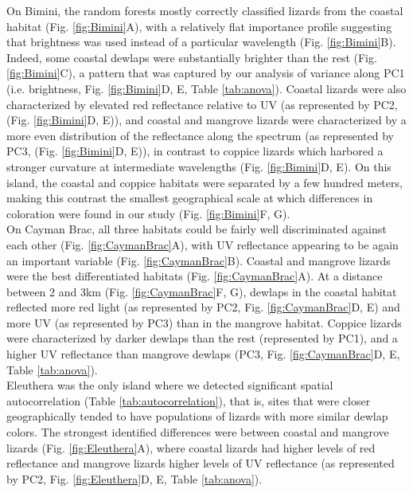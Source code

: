 On Bimini, the random forests mostly correctly classified lizards from the coastal habitat (Fig. \ref{fig:Bimini}A), with a relatively flat importance profile suggesting that brightness was used instead of a particular wavelength (Fig. \ref{fig:Bimini}B). Indeed, some coastal dewlaps were substantially brighter than the rest (Fig. \ref{fig:Bimini}C), a pattern that was captured by our analysis of variance along PC1 (i.e. brightness, Fig. \ref{fig:Bimini}D, E, Table \ref{tab:anova}). Coastal lizards were also characterized by elevated red reflectance relative to UV (as represented by PC2, (Fig. \ref{fig:Bimini}D, E)), and coastal and mangrove lizards were characterized by a more even distribution of the reflectance along the spectrum (as represented by PC3, (Fig. \ref{fig:Bimini}D, E)), in contrast to coppice lizards which harbored a stronger curvature at intermediate wavelengths (Fig. \ref{fig:Bimini}D, E). On this island, the coastal and coppice habitats were separated by a few hundred meters, making this contrast the smallest geographical scale at which differences in coloration were found in our study (Fig. \ref{fig:Bimini}F, G).\\

On Cayman Brac, all three habitats could be fairly well discriminated against each other (Fig. \ref{fig:CaymanBrac}A), with UV reflectance appearing to be again an important variable (Fig. \ref{fig:CaymanBrac}B). Coastal and mangrove lizards were the best differentiated habitats (Fig. \ref{fig:CaymanBrac}A). At a distance between 2 and 3km (Fig. \ref{fig:CaymanBrac}F, G), dewlaps in the coastal habitat reflected more red light (as represented by PC2, Fig. \ref{fig:CaymanBrac}D, E) and more UV (as represented by PC3) than in the mangrove habitat. Coppice lizards were characterized by darker dewlaps than the rest (represented by PC1), and a higher UV reflectance than mangrove dewlaps (PC3, Fig. \ref{fig:CaymanBrac}D, E, Table \ref{tab:anova}).\\

Eleuthera was the only island where we detected significant spatial autocorrelation (Table \ref{tab:autocorrelation}), that is, sites that were closer geographically tended to have populations of lizards with more similar dewlap colors. The strongest identified differences were between coastal and mangrove lizards (Fig. \ref{fig:Eleuthera}A), where coastal lizards had higher levels of red reflectance and mangrove lizards higher levels of UV reflectance (as represented by PC2, Fig. \ref{fig:Eleuthera}D, E, Table \ref{tab:anova}).\\

